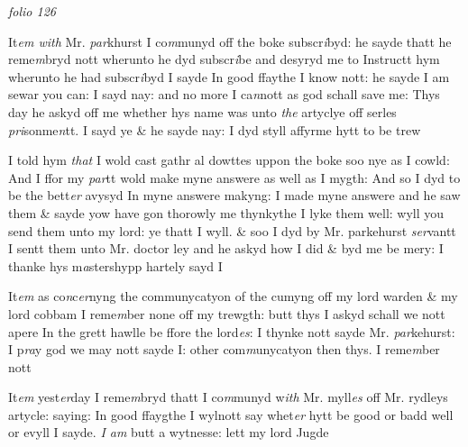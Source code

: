 \documentclass[12pt, a4paper]{book}
\begin{document}

\textit{folio 126}



 	
 		
		\ifthenelse{\isodd{\thepage}}
		{\reversemarginpar}
		{\normalmarginpar}
		It\textit{em with} Mr. \textit{par}khurst I co\textit{m}munyd off the boke subscr\textit{i}byd: he
 sayde thatt he reme\textit{m}bryd nott wherunto he dyd subscr\textit{i}be
 and desyryd me to Instructt hym wherunto he had subscr\textit{i}byd
 I sayde In good ffaythe I know nott: he sayde I am
 sewar you can: I sayd nay: and no more I ca\textit{n}nott as
 god schall save me: Thys day he askyd off me whether
 hys name was unto \textit{the} artyclye off serles \textit{pri}sonme\textit{n}tt. I sayd
 ye \& he sayde nay: I dyd
			 styll affyrme hytt to be trew
 	
 	
		\ifthenelse{\isodd{\thepage}}
		{\reversemarginpar}
		{\normalmarginpar}
		I told hym \textit{that} I wold cast gathr
			 al dowttes uppon the boke soo nye
 as I cowld: And I ffor my \textit{par}tt wold make myne answere
			 as
 well as I mygth: And so I dyd to be the bett\textit{er} avysyd
 In myne answere makyng: I made myne answere
 and he saw them \& sayde yow have gon thorowly me
 thynkythe I lyke them well: wyll you send them unto
 my lord: ye thatt I wyll. \& soo I dyd by Mr. parkehurst
 \textit{ser}vantt I sentt them unto Mr. doctor ley and he askyd how I did
 \& byd me be mery: I thanke hys m\textit{a}stershypp hartely sayd I
 	
		\ifthenelse{\isodd{\thepage}}
		{\reversemarginpar}
		{\normalmarginpar}
		It\textit{em} as co\textit{n}c\textit{er}nyng the communycatyon of the
			 cumyng off my lord warden \& my lord cobbam
 I reme\textit{m}ber none off my trewgth: butt thys I askyd schall
 we nott apere In the grett hawlle be ffore the lord\textit{es}: I
 		thynke nott sayde Mr. \textit{par}kehurst: I p\textit{ra}y god we may nott
 sayde I: other com\textit{m}unycatyon then thys. I reme\textit{m}ber nott

 	
 		
		\ifthenelse{\isodd{\thepage}}
		{\reversemarginpar}
		{\normalmarginpar}
		It\textit{em} yest\textit{er}day I reme\textit{m}bryd thatt I co\textit{m}munyd w\textit{ith} Mr. myll\textit{es}
 off Mr. rydleys artycle: saying: In good ffaygthe I wylnott  say
 whet\textit{er }hytt be good or badd well or evyll I sayde.\textit{ I am}
 butt a wytnesse: lett my lord Jugde
\end{document}
